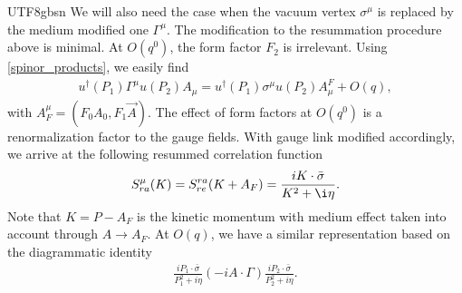 \documentclass[11pt]{article}\def\baselinestretch{1.4}
\def\G{{\Gamma}}
\def\h{\eta}
\def\m{{\mu}}
\def\s{{\sigma}}
\newcommand{\dg}{\dagger}
\begin{document}
\begin{CJK}{UTF8}{gbsn}
We will also need the case when the vacuum vertex $\s^\m$ is replaced by the medium modified one $\G^\m$. The modification to the resummation procedure above is minimal. At $O(q^0)$, the form factor $F_2$ is irrelevant. Using \eqref{spinor_products}, we easily find
\begin{align}
u^\dg(P_1)\G^\m u(P_2)A_\m=u^\dg(P_1)\s^\m u(P_2)A^F_\m+O(q),
\end{align}
with $A_F^\m=(F_0 A_0,F_1 \vec{A})$. The effect of form factors at $O(q^0)$ is a renormalization factor to the gauge fields. With gauge link modified accordingly, we arrive at the following resummed correlation function
\begin{align}
S_{ra}^\m(K)=S_{re}^{ra}(K+A_F)=\frac{iK\cdot\bar{\s}}{K^2+\i\h}.
\end{align}
Note that $K=P-A_F$ is the kinetic momentum with medium effect taken into account through $A\to A_F$. At $O(q)$, we have a similar representation based on the diagrammatic identity
\begin{align}
\frac{iP_1\cdot\bar{\s}}{P_1^2+i\h}(-i A\cdot\G)\frac{iP_2\cdot\bar{\s}}{P_2^2+i\h}.
\end{align}


\end{CJK}
\end{document}
